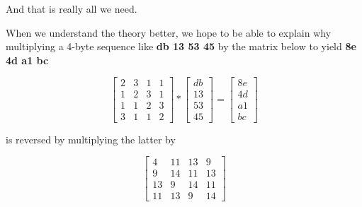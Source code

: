 \documentclass[11pt, oneside]{article}
\begin{document}
And that is really all we need.

When we understand the theory better, we hope to be able to explain why multiplying a 4-byte sequence like \textbf{db 13 53 45} by the matrix below to yield \textbf{8e 4d a1 bc} 

\[ 
\begin{bmatrix}
2 & 3 & 1 & 1 \\
1 & 2 & 3 & 1 \\
1 & 1 & 2 & 3 \\
3 & 1 & 1 & 2
\end{bmatrix} 
*
\begin{bmatrix}
db \\
13 \\
53 \\
45
\end{bmatrix} 
=
\begin{bmatrix}
8e \\
4d \\
a1 \\
bc
\end{bmatrix} 
\]

is reversed by multiplying the latter by

\[ \begin{bmatrix}
4 &11 &13 & 9 \\
9 &14 &11 & 13 \\
13 & 9 &14 & 11 \\
11 &13 & 9 & 14
\end{bmatrix} \]
\end{document}
